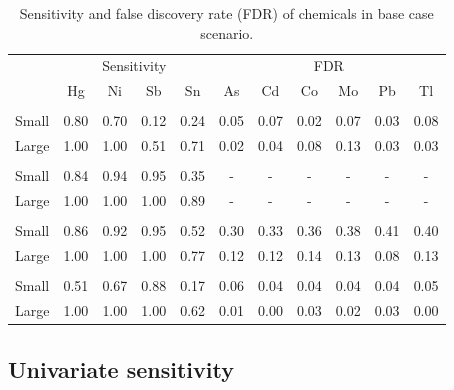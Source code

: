 \documentclass[12pt, twoside]{amherstthesis}
\begin{document}
\begin{table}

\caption{\label{tab:basecasetab}Sensitivity and false discovery rate (FDR) of chemicals in base case scenario.}
\centering
\begin{tabular}[t]{>{\raggedright\arraybackslash}p{6em}cccccccccc}
\toprule
\multicolumn{1}{c}{ } & \multicolumn{4}{c}{Sensitivity} & \multicolumn{6}{c}{FDR} \\
\cmidrule(l{3pt}r{3pt}){2-5} \cmidrule(l{3pt}r{3pt}){6-11}
 & Hg & Ni & Sb & Sn & As & Cd & Co & Mo & Pb & Tl\\
\midrule
\addlinespace[0.3em]
\multicolumn{11}{l}{\textbf{Naive MLR}}\\
\hspace{1em}Small & 0.80 & 0.70 & 0.12 & 0.24 & 0.05 & 0.07 & 0.02 & 0.07 & 0.03 & 0.08\\
\hspace{1em}Large & 1.00 & 1.00 & 0.51 & 0.71 & 0.02 & 0.04 & 0.08 & 0.13 & 0.03 & 0.03\\
\addlinespace[0.3em]
\multicolumn{11}{l}{\textbf{Oracle MLR}}\\
\hspace{1em}Small & 0.84 & 0.94 & 0.95 & 0.35 & - & - & - & - & - & -\\
\hspace{1em}Large & 1.00 & 1.00 & 1.00 & 0.89 & - & - & - & - & - & -\\
\addlinespace[0.3em]
\multicolumn{11}{l}{\textbf{BKMR}}\\
\hspace{1em}Small & 0.86 & 0.92 & 0.95 & 0.52 & 0.30 & 0.33 & 0.36 & 0.38 & 0.41 & 0.40\\
\hspace{1em}Large & 1.00 & 1.00 & 1.00 & 0.77 & 0.12 & 0.12 & 0.14 & 0.13 & 0.08 & 0.13\\
\addlinespace[0.3em]
\multicolumn{11}{l}{\textbf{BSR}}\\
\hspace{1em}Small & 0.51 & 0.67 & 0.88 & 0.17 & 0.06 & 0.04 & 0.04 & 0.04 & 0.04 & 0.05\\
\hspace{1em}Large & 1.00 & 1.00 & 1.00 & 0.62 & 0.01 & 0.00 & 0.03 & 0.02 & 0.03 & 0.00\\
\bottomrule
\end{tabular}
\end{table}
\hypertarget{univariate-sensitivity}{%
\subsection{Univariate sensitivity}\label{univariate-sensitivity}}
\end{document}
